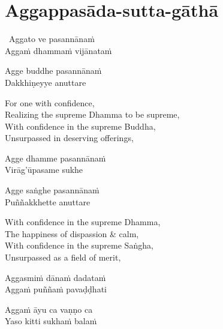 \suttaRef{[MJG]}

\section{Aggappasāda-sutta-gāthā}
\label{aggappasada-sutta-gatha}

\begin{pali-hangtogether}
  \anglebracketleft\ \hspace{-0.5mm}Aggato ve pasannānaṁ \hspace{-0.5mm}\anglebracketright\ \\
  Aggaṁ dhammaṁ vijānataṁ
\end{pali-hangtogether}
\begin{pali-hangtogether}
  Agge buddhe pasannānaṁ\\
  Dakkhiṇeyye anuttare
\end{pali-hangtogether}

\begin{english-verses}
  For one with confidence,\\
  Realizing the supreme Dhamma to be supreme,\\
  With confidence in the supreme Buddha,\\
  Unsurpassed in deserving offerings,
\end{english-verses}

\begin{pali-hang}
  Agge dhamme pasannānaṁ\\
  Virāg'ūpasame sukhe
\end{pali-hang}
\begin{pali-hangtogether}
  Agge saṅghe pasannānaṁ\\
  Puññakkhette anuttare
\end{pali-hangtogether}

\begin{english-verses}
  With confidence in the supreme Dhamma,\\
  The happiness of dispassion \& calm,\\
  With confidence in the supreme Saṅgha,\\
  Unsurpassed as a field of merit,
\end{english-verses}

\begin{pali-hang}
  Aggasmiṁ dānaṁ dadataṁ\\
  Aggaṁ puññaṁ pavaḍḍhati
\end{pali-hang}
\begin{pali-hangtogether}
  Aggaṁ āyu ca vaṇṇo ca\\
  Yaso kitti sukhaṁ balaṁ
\end{pali-hangtogether}

